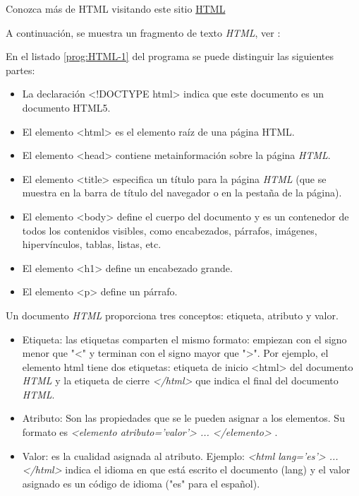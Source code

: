  
\begin{tcolorbox}
	[colback=red!5!white,colframe=red!75!black,fonttitle=\bfseries,title=HTML]
	Conozca m\'as de HTML visitando este sitio  \href{https://www.w3.org/html/}{HTML}
\end{tcolorbox}


A continuación, se muestra un fragmento  de texto \textit{HTML}, ver :

      \label{prog:HTML-1}


En el listado \ref{prog:HTML-1} del programa se puede distinguir las siguientes partes:
\begin{itemize}
	\item  La declaración <!DOCTYPE html> indica que este documento es un documento HTML5.
	\item El elemento <html> es el elemento raíz de una página HTML.
	\item El elemento <head> contiene metainformación sobre la página \textit{HTML}.
	\item El elemento <title> especifica un título para la página \textit{HTML} (que se muestra en la barra de título del navegador o en la pestaña de la página).
	\item El elemento <body> define el cuerpo del documento y es un contenedor de todos los contenidos visibles, como encabezados, párrafos, imágenes, hipervínculos, tablas, listas, etc.
	\item El elemento <h1> define un encabezado grande.
	\item El elemento <p> define un párrafo.
\end{itemize}

Un documento \textit{HTML} proporciona tres conceptos: etiqueta, atributo y valor.

\begin{itemize}
	\item Etiqueta: las etiquetas comparten el mismo formato: empiezan con el signo menor que "<" y terminan con el signo mayor que ">". 	Por ejemplo, el elemento html tiene dos etiquetas: etiqueta de inicio <html>   del documento \textit{HTML} y la etiqueta de cierre \textit{</html>} que indica el final del documento \textit{HTML}.
	
	\item Atributo: Son las propiedades que se le pueden asignar a los elementos. Su formato es  \textit{<elemento atributo='valor'> ... </elemento> }.
	\item Valor: es la cualidad asignada al atributo. Ejemplo:  \textit{<html lang='es'> ... </html>} indica el idioma en que está escrito el documento (lang) y el valor asignado es un código de idioma ("es" para el español).
\end{itemize}

